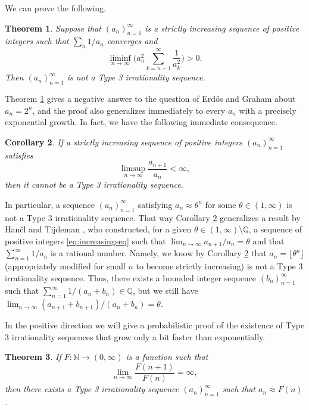 \documentclass[11pt,letterpaper,reqno]{amsart}
\numberwithin{equation}{section}
\newtheorem{theorem}{Theorem}[section]
\newtheorem{corollary}[theorem]{Corollary}
\theoremstyle{definition}
\numberwithin{equation}{section}
\begin{document}
We can prove the following.

\begin{theorem}\label{thm:type3}
Suppose that $(a_n)_{n=1}^{\infty}$ is a strictly increasing sequence of positive integers such that $\sum_n 1/a_n$ converges and
\begin{equation}\label{eq:t3cond}
\liminf_{n\to\infty} \biggl( a_n^2 \sum_{k=n+1}^{\infty} \frac{1}{a_k^2} \biggr) > 0.
\end{equation}
Then $(a_n)_{n=1}^{\infty}$ is not a Type 3 irrationality sequence.
\end{theorem}

Theorem \ref{thm:type3} gives a negative answer to the question of Erd\H{o}s and Graham about $a_n=2^n$, and the proof also generalizes immediately to every $a_n$ with a precisely exponential growth. In fact, we have the following immediate consequence.

\begin{corollary}\label{cor:type3}
If a strictly increasing sequence of positive integers  $(a_n)_{n=1}^{\infty}$ satisfies
\[ \limsup_{n\to\infty} \frac{a_{n+1}}{a_n} < \infty, \]
then it cannot be a Type 3 irrationality sequence.
\end{corollary}

In particular, a sequence $(a_n)_{n=1}^{\infty}$ satisfying $a_n\approx \theta^n$ for some $\theta\in(1,\infty)$ is not a Type 3 irrationality sequence.
That way Corollary \ref{cor:type3} generalizes a result by Han\v{c}l and Tijdeman \cite[Theorem 4.1]{HT04}, who constructed, for a given $\theta\in(1,\infty)\setminus\mathbb{Q}$, a sequence of positive integers \eqref{eq:increasingseq} such that $\lim_{n\to\infty}a_{n+1}/a_n=\theta$ and that $\sum_{n=1}^{\infty}1/a_n$ is a rational number.
Namely, we know by Corollary \ref{cor:type3} that $a_n=\lfloor\theta^n\rfloor$ (appropriately modified for small $n$ to become strictly increasing) is not a Type 3 irrationality sequence. Thus, there exists a bounded integer sequence $(b_n)_{n=1}^{\infty}$ such that $\sum_{n=1}^{\infty}1/(a_n+b_n)\in\mathbb{Q}$, but we still have $\lim_{n\to\infty}(a_{n+1}+b_{n+1})/(a_n+b_n)=\theta$.

In the positive direction we will give a probabilistic proof of the existence of Type 3 irrationality sequences that grow only a bit faster than exponentially.

\begin{theorem}\label{thm:type3faster}
If $F\colon\mathbb{N}\to(0,\infty)$ is a function such that
\begin{equation}\label{eq:type3fa0}
\lim_{n\to\infty} \frac{F(n+1)}{F(n)}=\infty,
\end{equation}
then there exists a Type 3 irrationality sequence $(a_n)_{n=1}^{\infty}$ such that $a_n \approx F(n)$.
\end{theorem}
\end{document}
